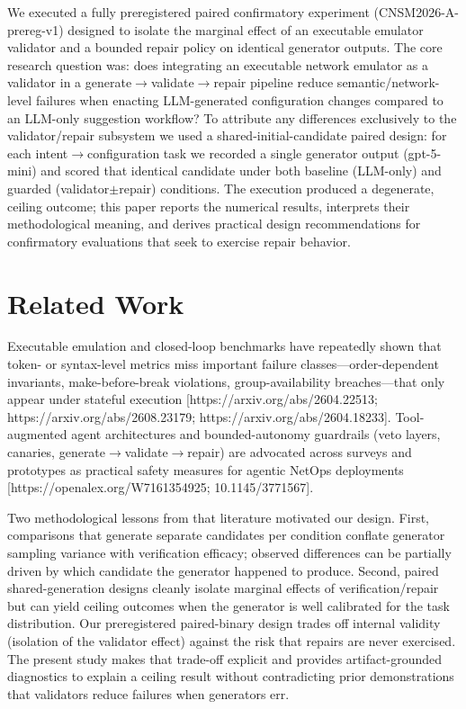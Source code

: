 \documentclass[conference]{IEEEtran}
\begin{document}
We executed a fully preregistered paired confirmatory experiment (CNSM2026-A-prereg-v1) designed to isolate the marginal effect of an executable emulator validator and a bounded repair policy on identical generator outputs. The core research question was: does integrating an executable network emulator as a validator in a generate\ensuremath{\rightarrow}validate\ensuremath{\rightarrow}repair pipeline reduce semantic/network-level failures when enacting LLM-generated configuration changes compared to an LLM-only suggestion workflow? To attribute any differences exclusively to the validator/repair subsystem we used a shared-initial-candidate paired design: for each intent\ensuremath{\rightarrow}configuration task we recorded a single generator output (gpt-5-mini) and scored that identical candidate under both baseline (LLM-only) and guarded (validator\ensuremath{\pm}repair) conditions. The execution produced a degenerate, ceiling outcome; this paper reports the numerical results, interprets their methodological meaning, and derives practical design recommendations for confirmatory evaluations that seek to exercise repair behavior.

\section{Related Work}
Executable emulation and closed-loop benchmarks have repeatedly shown that token- or syntax-level metrics miss important failure classes---order-dependent invariants, make-before-break violations, group-availability breaches---that only appear under stateful execution [https://arxiv.org/abs/2604.22513; https://arxiv.org/abs/2608.23179; https://arxiv.org/abs/2604.18233]. Tool-augmented agent architectures and bounded-autonomy guardrails (veto layers, canaries, generate\ensuremath{\rightarrow}validate\ensuremath{\rightarrow}repair) are advocated across surveys and prototypes as practical safety measures for agentic NetOps deployments [https://openalex.org/W7161354925; 10.1145/3771567].

Two methodological lessons from that literature motivated our design. First, comparisons that generate separate candidates per condition conflate generator sampling variance with verification efficacy; observed differences can be partially driven by which candidate the generator happened to produce. Second, paired shared-generation designs cleanly isolate marginal effects of verification/repair but can yield ceiling outcomes when the generator is well calibrated for the task distribution. Our preregistered paired-binary design trades off internal validity (isolation of the validator effect) against the risk that repairs are never exercised. The present study makes that trade-off explicit and provides artifact-grounded diagnostics to explain a ceiling result without contradicting prior demonstrations that validators reduce failures when generators err.
\end{document}
